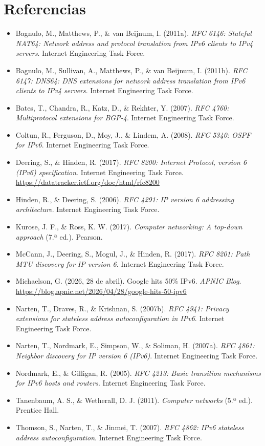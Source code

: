 \documentclass[12pt,letterpaper]{article}
\begin{document}
\section*{Referencias}
\begin{itemize}[leftmargin=1.5em,itemsep=3pt]
\item[] Bagnulo, M., Matthews, P., \& van Beijnum, I. (2011a). \emph{RFC 6146: Stateful NAT64: Network address and protocol translation from IPv6 clients to IPv4 servers}. Internet Engineering Task Force.
\item[] Bagnulo, M., Sullivan, A., Matthews, P., \& van Beijnum, I. (2011b). \emph{RFC 6147: DNS64: DNS extensions for network address translation from IPv6 clients to IPv4 servers}. Internet Engineering Task Force.
\item[] Bates, T., Chandra, R., Katz, D., \& Rekhter, Y. (2007). \emph{RFC 4760: Multiprotocol extensions for BGP-4}. Internet Engineering Task Force.
\item[] Coltun, R., Ferguson, D., Moy, J., \& Lindem, A. (2008). \emph{RFC 5340: OSPF for IPv6}. Internet Engineering Task Force.
\item[] Deering, S., \& Hinden, R. (2017). \emph{RFC 8200: Internet Protocol, version 6 (IPv6) specification}. Internet Engineering Task Force. \url{https://datatracker.ietf.org/doc/html/rfc8200}
\item[] Hinden, R., \& Deering, S. (2006). \emph{RFC 4291: IP version 6 addressing architecture}. Internet Engineering Task Force.
\item[] Kurose, J. F., \& Ross, K. W. (2017). \emph{Computer networking: A top-down approach} (7.ª ed.). Pearson.
\item[] McCann, J., Deering, S., Mogul, J., \& Hinden, R. (2017). \emph{RFC 8201: Path MTU discovery for IP version 6}. Internet Engineering Task Force.
\item[] Michaelson, G. (2026, 28 de abril). Google hits 50\% IPv6. \emph{APNIC Blog}. \url{https://blog.apnic.net/2026/04/28/google-hits-50-ipv6}
\item[] Narten, T., Draves, R., \& Krishnan, S. (2007b). \emph{RFC 4941: Privacy extensions for stateless address autoconfiguration in IPv6}. Internet Engineering Task Force.
\item[] Narten, T., Nordmark, E., Simpson, W., \& Soliman, H. (2007a). \emph{RFC 4861: Neighbor discovery for IP version 6 (IPv6)}. Internet Engineering Task Force.
\item[] Nordmark, E., \& Gilligan, R. (2005). \emph{RFC 4213: Basic transition mechanisms for IPv6 hosts and routers}. Internet Engineering Task Force.
\item[] Tanenbaum, A. S., \& Wetherall, D. J. (2011). \emph{Computer networks} (5.ª ed.). Prentice Hall.
\item[] Thomson, S., Narten, T., \& Jinmei, T. (2007). \emph{RFC 4862: IPv6 stateless address autoconfiguration}. Internet Engineering Task Force.
\end{itemize}
\end{document}

